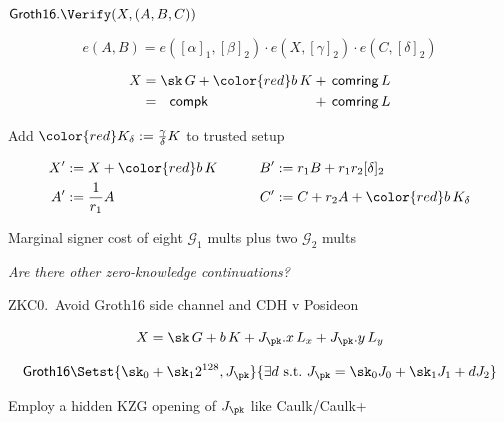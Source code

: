 \documentclass{beamer}
\def\comring{\ensuremath{\mathsf{comring}}\xspace}
\def\compk{\ensuremath{\mathsf{compk}}\xspace}
\begin{document}
\begin{frame}[t] %

$\mathsf{Groth16}.\Verify(X,(A,B,C))$

$$ e(A,B) = e([\alpha]_1, [\beta]_2) \cdot e(X, [\gamma]_2) \cdot e(C, [\delta]_2) $$

\smallskip

$$ \begin{alignedat}{2}
 X &= \sk \, G + {\color{red} b \, K} &&+ \, \comring \, L \\
   &= \, \, \, \, \compk  &&+ \, \comring \, L \\
\end{alignedat} $$

\bigskip

Add $\color{red} K_\delta := {\gamma\over\delta} K$ to trusted setup

$$ \begin{aligned}
X' &:= X + {\color{red} b\, K} &\quad&&
B' &:= r_1 B + r_1 r_2 [\delta]_2 \\
A' &:= {1 \over r_1} A & &&
C' &:= C + r_2 A + {\color{red} b\, K_\delta} \\
\end{aligned} $$

\bigskip\bigskip

\hspace{5pt} Marginal signer cost of eight $\mathcal{G}_1$ mults plus two $\mathcal{G}_2$ mults 


\end{frame}






\begin{frame} %

\hspace{30pt} {\it Are there other zero-knowledge continuations?}

\bigskip\medskip

ZKC0.\  Avoid Groth16 side channel and CDH v Posideon \\ \medskip

$$ X = \sk \, G + b \, K + J_\pk.x \, L_x + J_\pk.y \, L_y $$

\vspace{-20pt}
$$ \mathsf{Groth16} \Setst{ \sk_0 + \sk_1 2^{128}, J_\pk }{ 
	\exists d \textrm{\ s.t.\ }
	J_\pk = \sk_0 J_0 + \sk_1 J_1 + d J_2
} $$

\smallskip

Employ a hidden KZG opening of $J_\pk$ like Caulk/Caulk+

\end{frame}
\end{document}
